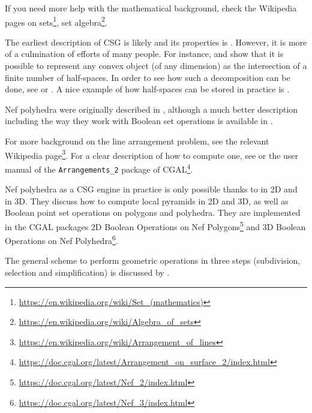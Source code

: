 If you need more help with the mathematical background, check the Wikipedia pages on sets\footnote{\url{https://en.wikipedia.org/wiki/Set_(mathematics)}}, set algebra\footnote{\url{https://en.wikipedia.org/wiki/Algebra_of_sets}}.

The earliest description of CSG is likely \citet[\S{}12.3]{Requicha77} and its properties is \citet{Requicha78}.
However, it is more of a culmination of efforts of many people.
For instance, \citet{Shamos76} and \citet{Preparata79} show that it is possible to represent any convex object (of any dimension) as the intersection of a finite number of half-spaces.
In order to see how such a decomposition can be done, see \citet{Chazelle79} or \citet{Bajaj90}.
A nice example of how half-spaces can be stored in practice is \citet{Naylor90}.

Nef polyhedra were originally described in \citet{Nef78}, although a much better description including the way they work with Boolean set operations is available in \citet{Bieri88}.

For more background on the line arrangement problem, see the relevant Wikipedia page\footnote{\url{https://en.wikipedia.org/wiki/Arrangement_of_lines}}.
For a clear description of how to compute one, see \citet[\S{}2]{deBerg08} or the user manual of the \texttt{Arrangements\_2} package of CGAL\footnote{\url{https://doc.cgal.org/latest/Arrangement_on_surface_2/index.html}}.

Nef polyhedra as a CSG engine in practice is only possible thanks to \citet{Seel01} in 2D and \citet{Hachenberger06} in 3D.
They discuss how to compute local pyramids in 2D and 3D, as well as Boolean point set operations on polygons and polyhedra.
They are implemented in the CGAL packages 2D Boolean Operations on Nef Polygons\footnote{\url{https://doc.cgal.org/latest/Nef_2/index.html}} and 3D Boolean Operations on Nef Polyhedra\footnote{\url{https://doc.cgal.org/latest/Nef_3/index.html}}.

The general scheme to perform geometric operations in three steps (subdivision, selection and simplification) is discussed by \citet{Rossignac89}.
